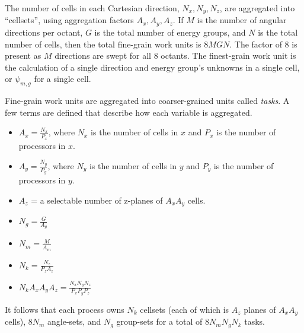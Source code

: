 \documentclass[times,final]{elsarticle}
\begin{document}
The number of cells in each Cartesian direction, $N_x, N_y, N_z$, are aggregated into ``cellsets'', using aggregation factors $A_x, A_y, A_z$.
If $M$ is the number of angular directions per octant, $G$ is the total number of energy groups, and $N$ is the total number of cells, then the total fine-grain work units is $8MGN$.
The factor of 8 is present as $M$ directions are swept for all 8 octants.
The finest-grain work unit is the calculation of a single direction and energy group's unknowns in a single cell, or $\psi_{m,g}$ for a single cell.

Fine-grain work units are aggregated into coarser-grained units called \textit{tasks}. A few terms are defined that describe how each variable is aggregated.
\begin{itemize}
\item $A_x = \frac{N_x}{P_x}$, where $N_x$ is the number of cells in $x$ and $P_x$ is the number of processors in $x$.
\item $A_y = \frac{N_y}{P_y}$, where $N_y$ is the number of cells in $y$ and $P_y$ is the number of processors in $y$.
\item $A_z$ = a selectable number of z-planes of $A_x A_y$ cells.
\item $N_g = \frac{G}{A_g}$
\item $N_m = \frac{M}{A_m}$
\item $N_k = \frac{N_z}{P_z A_z}$
\item $N_k A_x A_y A_z = \frac{N_x N_y N_z}{P_x P_y P_z}$
\end{itemize}

It follows that each process owns $N_k$ cellsets (each of which is $A_z$ planes of $A_x A_y$ cells), $8N_m$ angle-sets, and $N_g$ group-sets for a total of $8N_m N_g N_k$ tasks.
\end{document}

